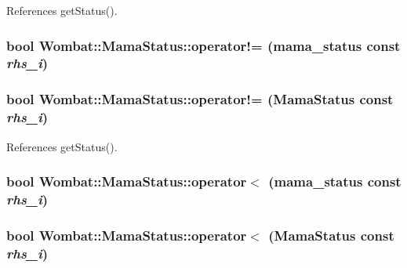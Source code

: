 References getStatus().\hypertarget{classWombat_1_1MamaStatus_a68ba5e4ed85254d372ef9f545b1e405e}{
\subsubsection[{operator!=}]{\setlength{\rightskip}{0pt plus 5cm}bool Wombat::MamaStatus::operator!= (mama\_\-status const  {\em rhs\_\-i})}}
\label{classWombat_1_1MamaStatus_a68ba5e4ed85254d372ef9f545b1e405e}
\hypertarget{classWombat_1_1MamaStatus_aea70b9860511953e4c019b39a2222976}{
\subsubsection[{operator!=}]{\setlength{\rightskip}{0pt plus 5cm}bool Wombat::MamaStatus::operator!= ({\bf MamaStatus} const  {\em rhs\_\-i})}}
\label{classWombat_1_1MamaStatus_aea70b9860511953e4c019b39a2222976}


References getStatus().\hypertarget{classWombat_1_1MamaStatus_adadb56f2f4997e9738a5872dc41276d1}{
\subsubsection[{operator$<$}]{\setlength{\rightskip}{0pt plus 5cm}bool Wombat::MamaStatus::operator$<$ (mama\_\-status const  {\em rhs\_\-i})}}
\label{classWombat_1_1MamaStatus_adadb56f2f4997e9738a5872dc41276d1}
\hypertarget{classWombat_1_1MamaStatus_a74b1437ed8dcc7703a42137738e352f7}{
\subsubsection[{operator$<$}]{\setlength{\rightskip}{0pt plus 5cm}bool Wombat::MamaStatus::operator$<$ ({\bf MamaStatus} const  {\em rhs\_\-i})}}
\label{classWombat_1_1MamaStatus_a74b1437ed8dcc7703a42137738e352f7}


